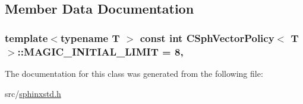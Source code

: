 \subsection{Member Data Documentation}
\hypertarget{classCSphVectorPolicy_a3c72f01636730f15aeb472cae9369f25}{
\subsubsection[{M\-A\-G\-I\-C\-\_\-\-I\-N\-I\-T\-I\-A\-L\-\_\-\-L\-I\-M\-I\-T}]{\setlength{\rightskip}{0pt plus 5cm}template$<$typename T $>$ const {\bf int} {\bf C\-Sph\-Vector\-Policy}$<$ T $>$\-::M\-A\-G\-I\-C\-\_\-\-I\-N\-I\-T\-I\-A\-L\-\_\-\-L\-I\-M\-I\-T = 8\hspace{0.3cm}{\ttfamily [static]}, {\ttfamily [protected]}}}\label{classCSphVectorPolicy_a3c72f01636730f15aeb472cae9369f25}


The documentation for this class was generated from the following file\-:\begin{DoxyCompactItemize}
\item 
src/\hyperlink{sphinxstd_8h}{sphinxstd.\-h}\end{DoxyCompactItemize}
